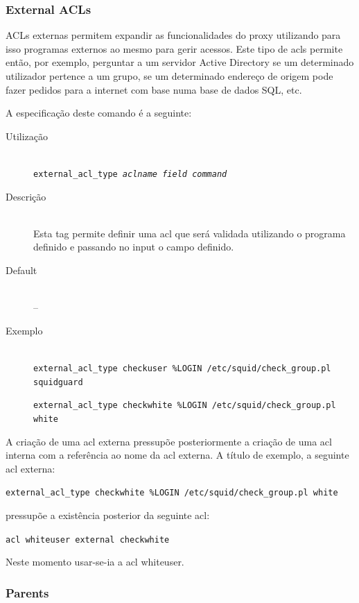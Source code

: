\subsubsection{External ACLs}

ACLs externas permitem expandir as funcionalidades do proxy utilizando
para isso programas externos ao mesmo para gerir acessos.
Este tipo de acls permite então, por exemplo, perguntar a um servidor
Active Directory se um determinado utilizador pertence a um grupo, se
um determinado endereço de origem pode fazer pedidos para a internet
com base numa base de dados SQL, etc.

A especificação deste comando é a seguinte:


\begin{description}
\item[Utilização]~\\
\texttt{external\_acl\_type \emph{aclname} \emph{field}
\emph{command}}

\item[Descrição]~\\
Esta tag permite definir uma acl que será validada utilizando o
programa definido e passando no input o campo definido.

\item[Default]~\\
--

\item[Exemplo]~\\
\texttt{external\_acl\_type checkuser \%LOGIN /etc/squid/check\_group.pl
squidguard}

\texttt{external\_acl\_type checkwhite \%LOGIN /etc/squid/check\_group.pl
white}
\end{description}

A criação de uma acl externa pressupõe posteriormente a
criação de uma acl interna com a referência ao nome da acl
externa.
A título de exemplo, a seguinte acl externa:

\texttt{external\_acl\_type checkwhite \%LOGIN /etc/squid/check\_group.pl
white}

pressupõe a existência posterior da seguinte acl:

\texttt{acl whiteuser external checkwhite}

Neste momento usar-se-ia a acl whiteuser.

\subsubsection{Parents}

